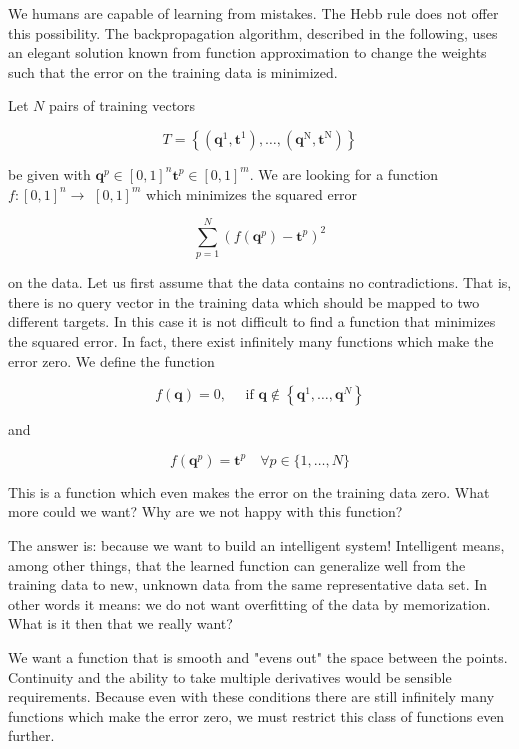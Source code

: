 \documentclass[10pt]{article}
\begin{document}
We humans are capable of learning from mistakes. The Hebb rule does not offer this possibility. The backpropagation algorithm, described in the following, uses an elegant solution known from function approximation to change the weights such that the error on the training data is minimized.

Let $N$ pairs of training vectors

$$
T=\left\{\left(\boldsymbol{q}^{1}, \boldsymbol{t}^{1}\right), \ldots,\left(\boldsymbol{q}^{\mathrm{N}}, \boldsymbol{t}^{\mathrm{N}}\right)\right\}
$$

be given with $\boldsymbol{q}^{p} \in[0,1]^{n} \boldsymbol{t}^{p} \in[0,1]^{m}$. We are looking for a function $f:[0,1]^{n} \rightarrow$ $[0,1]^{m}$ which minimizes the squared error

$$
\sum_{p=1}^{N}\left(f\left(\boldsymbol{q}^{p}\right)-\boldsymbol{t}^{p}\right)^{2}
$$

on the data. Let us first assume that the data contains no contradictions. That is, there is no query vector in the training data which should be mapped to two different targets. In this case it is not difficult to find a function that minimizes the squared error. In fact, there exist infinitely many functions which make the error zero. We define the function

$$
f(\boldsymbol{q})=0, \quad \text { if } \boldsymbol{q} \notin\left\{\boldsymbol{q}^{1}, \ldots, \boldsymbol{q}^{N}\right\}
$$

and

$$
f\left(\boldsymbol{q}^{p}\right)=\boldsymbol{t}^{p} \quad \forall p \in\{1, \ldots, N\}
$$

This is a function which even makes the error on the training data zero. What more could we want? Why are we not happy with this function?

The answer is: because we want to build an intelligent system! Intelligent means, among other things, that the learned function can generalize well from the training data to new, unknown data from the same representative data set. In other words it means: we do not want overfitting of the data by memorization. What is it then that we really want?

We want a function that is smooth and "evens out" the space between the points. Continuity and the ability to take multiple derivatives would be sensible requirements. Because even with these conditions there are still infinitely many functions which make the error zero, we must restrict this class of functions even further.
\end{document}
